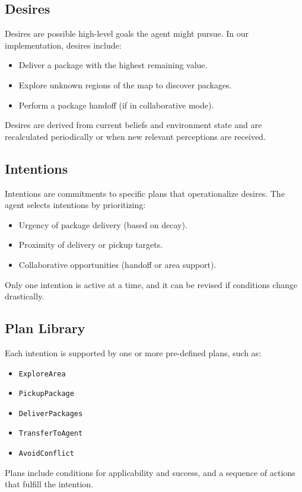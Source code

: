 \documentclass[conference]{IEEEtran}
\begin{document}
\subsection{Desires}

Desires are possible high-level goals the agent might pursue. In our implementation, desires include:
\begin{itemize}
	\item Deliver a package with the highest remaining value.
	\item Explore unknown regions of the map to discover packages.
	\item Perform a package handoff (if in collaborative mode).
\end{itemize}
Desires are derived from current beliefs and environment state and are recalculated periodically or when new relevant perceptions are received.

\subsection{Intentions}

Intentions are commitments to specific plans that operationalize desires. The agent selects intentions by prioritizing:
\begin{itemize}
	\item Urgency of package delivery (based on decay).
	\item Proximity of delivery or pickup targets.
	\item Collaborative opportunities (handoff or area support).
\end{itemize}
Only one intention is active at a time, and it can be revised if conditions change drastically.

\subsection{Plan Library}

Each intention is supported by one or more pre-defined plans, such as:
\begin{itemize}
	\item \texttt{ExploreArea}
	\item \texttt{PickupPackage}
	\item \texttt{DeliverPackages}
	\item \texttt{TransferToAgent}
	\item \texttt{AvoidConflict}
\end{itemize}
Plans include conditions for applicability and success, and a sequence of actions that fulfill the intention.
\end{document}
